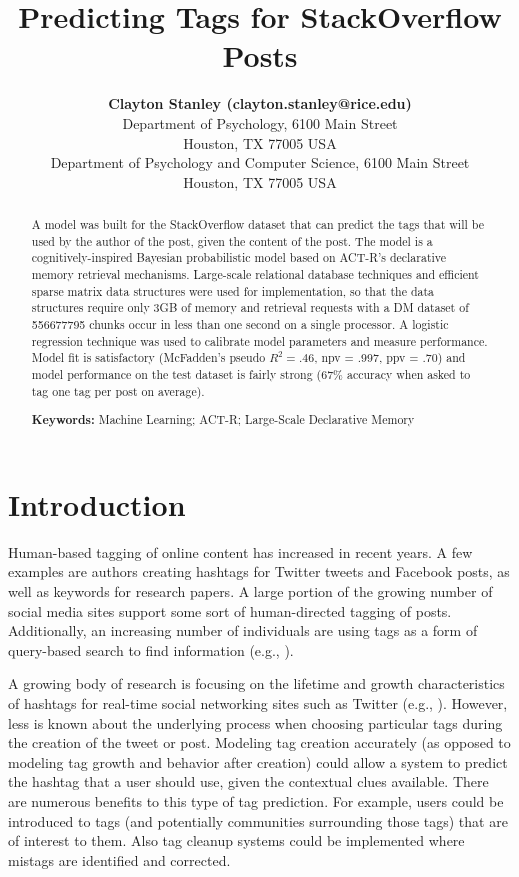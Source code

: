 \documentclass[10pt,letterpaper]{article}
\title{Predicting Tags for StackOverflow Posts}
\author{{\large \bf Clayton Stanley (clayton.stanley@rice.edu)} \\
  Department of Psychology, 6100 Main Street \\
  Houston, TX 77005 USA 
  \AND {\large \bf Michael D. Byrne (byrne@rice.edu)} \\
  Department of Psychology and Computer Science, 6100 Main Street \\
  Houston, TX 77005 USA }
\begin{document}
\maketitle

\frenchspacing

\begin{abstract}
  A model was built for the StackOverflow dataset that can predict the tags that will be used by the author of the post, given the content of the post.
  The model is a cognitively-inspired Bayesian probabilistic model based on ACT-R's declarative memory retrieval mechanisms.
  Large-scale relational database techniques and efficient sparse matrix data structures were used for implementation,
  so that the data structures require only 3GB of memory and retrieval requests with a DM dataset of \num{556677795} chunks occur in less than one second on a single processor.
  A logistic regression technique was used to calibrate model parameters and measure performance.
  Model fit is satisfactory (McFadden's pseudo $R_{}^{2}=.46$, npv = .997, ppv = .70) and model performance on the test dataset is fairly strong (67\% accuracy when asked to tag one tag per post on average).

  \textbf{Keywords:}
  Machine Learning; ACT-R; Large-Scale Declarative Memory
\end{abstract}

\section{Introduction}

Human-based tagging of online content has increased in recent years.
A few examples are authors creating hashtags for Twitter tweets and Facebook posts, as well as keywords for research papers.
A large portion of the growing number of social media sites support some sort of human-directed tagging of posts.
Additionally, an increasing number of individuals are using tags as a form of query-based search to find information
(e.g., ).

A growing body of research is focusing on the lifetime and growth characteristics of hashtags for real-time social networking sites such as Twitter
(e.g., ).
However, less is known about the underlying process when choosing particular tags during the creation of the tweet or post.
Modeling tag creation accurately (as opposed to modeling tag growth and behavior after creation) could allow a system to predict the hashtag that a user should use, given the contextual clues available.
There are numerous benefits to this type of tag prediction.
For example, users could be introduced to tags (and potentially communities surrounding those tags) that are of interest to them.
Also tag cleanup systems could be implemented where mistags are identified and corrected.
\end{document}
